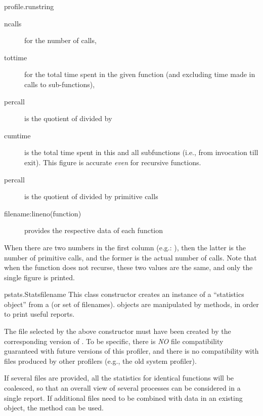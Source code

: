 \begin{funcdesc}{profile.run}{string}
\begin{description}
\item[ncalls ]
for the number of calls, 

\item[tottime ]
for the total time spent in the given function (and excluding time
made in calls to sub-functions),

\item[percall ]
is the quotient of  divided by 

\item[cumtime ]
is the total time spent in this and all subfunctions (i.e., from
invocation till exit). This figure is accurate \emph{even} for recursive
functions.

\item[percall ]
is the quotient of  divided by primitive calls

\item[filename:lineno(function) ]
provides the respective data of each function

\end{description}

When there are two numbers in the first column (e.g.: ),
then the latter is the number of primitive calls, and the former is
the actual number of calls.  Note that when the function does not
recurse, these two values are the same, and only the single figure is
printed.

\end{funcdesc}

\begin{funcdesc}{pstats.Stats}{filename}
This class constructor creates an instance of a ``statistics object''
from a  (or set of filenames).   objects are
manipulated by methods, in order to print useful reports.

The file selected by the above constructor must have been created by
the corresponding version of .  To be specific, there is
\emph{NO} file compatibility guaranteed with future versions of this
profiler, and there is no compatibility with files produced by other
profilers (e.g., the old system profiler).

If several files are provided, all the statistics for identical
functions will be coalesced, so that an overall view of several
processes can be considered in a single report.  If additional files
need to be combined with data in an existing  object, the
 method can be used.
\end{funcdesc}


